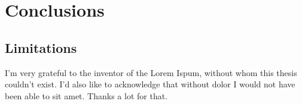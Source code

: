 \documentclass[a4paper,singleside,12pt]{report} %
\begin{document}
\section{Conclusions}\label{conclusions}


  \subsection{Limitations}\label{limitations}



	\appendix
	
	\printbibliography[heading=bibintoc] %
	
	\acknowledgements
	   I'm very grateful to the inventor of the Lorem Ispum, without whom this thesis couldn't exist. I'd also like to acknowledge that without dolor I would not have been able to sit amet. Thanks a lot for that.
		
\end{document}
